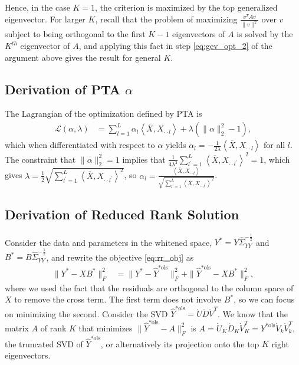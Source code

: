 \documentclass{article}
\begin{document}
Hence, in the case $K = 1$, the criterion is maximized by the top generalized
eigenvector. For larger $K$, recall that the problem of maximizing
$\frac{v^{T}Av}{\|v\|^{2}}$ over $v$ subject to being orthogonal to the first $K
- 1$ eigenvectors of $A$ is solved by the $K^{th}$ eigenvector of $A$, and
applying this fact in step \ref{eq:gev_opt_2} of the argument above gives the
result for general $K$.

\subsection{Derivation of PTA $\alpha$}
\label{subsec:pta_alpha_derivation}

 The Lagrangian of the optimization defined by PTA is
\begin{align*}
\mathcal{L}\left(\alpha, \lambda\right) &= \sum_{l = 1}^{L}
\alpha_{l}\left<\overline{X}, X_{\cdot\cdot l}\right> +
\lambda\left(\|\alpha\|^{2}_{2} - 1\right),
\end{align*}
which when differentiated with respect to $\alpha$ yields $\alpha_{l} =
-\frac{1}{2\lambda} \left<\overline{X}, X_{\cdot\cdot l}\right>$ for all $l$.
The constraint that $\|\alpha\|_{2}^{2} = 1$ implies that
$\frac{1}{4\lambda^{2}} \sum_{l^{\prime} = 1}^{L} \left<\overline{X},
X_{\cdot\cdot l^{\prime}}\right>^{2} = 1$, which gives $\lambda = \frac{1}{2}
\sqrt{\sum_{l^{\prime} =1 }^{L} \left<\overline{X}, X_{\cdot\cdot
    l^{\prime}}\right>^{2}}$, so $\alpha_{l} = \frac{\left<\overline{X},
  X_{\cdot\cdot l}\right>}{\sqrt{\sum_{l^{\prime} =1}^{L}\left<\overline{X},
    X_{\cdot\cdot l^{\prime}}\right>^{2}}}$.

\subsection{Derivation of Reduced Rank Solution}
\label{subsec:reduced_rank_derivation}

Consider the data and parameters in the whitened space, $Y^{\ast} =
Y\hat{\Sigma}_{YY}^{-\frac{1}{2}}$ and $B^{\ast} =
B\hat{\Sigma}_{YY}^{-\frac{1}{2}}$, and rewrite the objective \ref{eq:rr_obj} as
\begin{align*}
\|Y^{\ast} - XB^{\ast}\|_{F}^{2} &= \|Y^{\ast} - \hat{Y}^{\ast \text{ols}}\|_{F}^{2} + \|\hat{Y}^{\ast \text{ols}} - XB^{\ast}\|_{F}^{2},
\end{align*}
where we used the fact that the residuals are orthogonal to the column space of
$X$ to remove the cross term. The first term does not involve $B^{\ast}$, so we
can focus on minimizing the second. Consider the SVD $\hat{Y}^{\ast \text{ols}}
= \dot{U}\dot{D}\dot{V}^{T}$. We know that the matrix $A$ of rank $K$ that
minimizes $\|\hat{Y}^{\ast \text{ols}} - A\|_{F}^{2}$ is $A =
\dot{U}_{K}\dot{D}_{K}\dot{V}_{K}^{T} = Y^{\ast
  \text{ols}}\dot{V}_{k}\dot{V}_{k}^{T}$, the truncated SVD of $\hat{Y}^{\ast
  \text{ols}}$, or alternatively its projection onto the top $K$ right
eigenvectors.
\end{document}
